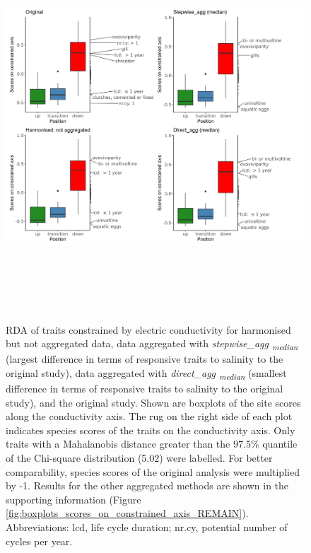 \documentclass{article}
\begin{document}
\begin{figure}[H]
  \centering
  \includegraphics[width=17cm, height=14.5cm]{boxplot_scores_combined.png}
  \caption{RDA of traits constrained by electric conductivity for harmonised but not aggregated data, data aggregated with \textit{stepwise\_agg \textsubscript{median}} (largest difference in terms of responsive traits to salinity to the original study), data aggregated with \textit{direct\_agg \textsubscript{median}} (smallest difference in terms of responsive traits to salinity to the original study), and the original study. Shown are boxplots of the site scores along the conductivity axis. The rug on the right side of each plot indicates species scores of the traits on the conductivity axis. Only traits with a Mahalanobis distance greater than the $97.5 \%$ quantile of the Chi-square distribution (5.02) were labelled. For better comparability, species scores of the original analysis were multiplied by -1. Results for the other aggregated methods are shown in the supporting information (Figure \ref{fig:boxplots_scores_on_constrained_axis_REMAIN}). Abbreviations: lcd, life cycle duration; nr.cy, potential number of cycles per year.}
  \label{fig:boxplot_scores_on_constrained_axis}
\end{figure}
\end{document}

